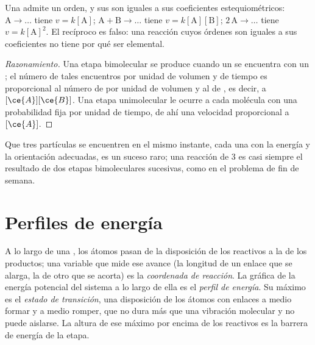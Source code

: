 \begin{proposition}\label{prop:b1:elementary-steps:elementary-law}
Una  admite un orden, y sus  son iguales
a sus coeficientes estequiométricos: $\mathrm{A} \to \dots$ tiene
$v = k[\mathrm{A}]$;
$\mathrm{A} + \mathrm{B} \to \dots$ tiene $v = k[\mathrm{A}][\mathrm{B}]$;
$2\,\mathrm{A} \to \dots$ tiene $v = k[\mathrm{A}]^2$. El recíproco es
falso: una reacción cuyos órdenes son iguales a sus coeficientes no tiene
por qué ser elemental.
\end{proposition}

\begin{proof}[Razonamiento]
Una etapa bimolecular se produce cuando un  se encuentra con un
; el número de tales encuentros por unidad de volumen y de tiempo es
proporcional al número de  por unidad de volumen y al de , es
decir, a
$[\ce{A}][\ce{B}]$. Una etapa unimolecular le ocurre a cada molécula con
una probabilidad fija por unidad de tiempo, de ahí una velocidad
proporcional a $[\ce{A}]$.
\end{proof}

\begin{remark}\label{rem:b1:elementary-steps:termolecular}
Que tres partículas se encuentren en el mismo instante, cada una con la
energía y la orientación adecuadas, es un suceso raro; una reacción de
 3 es casi siempre el resultado de dos etapas bimoleculares
sucesivas, como en el problema de fin de semana.
\end{remark}

\section{Perfiles de energía}

\begin{definition}\label{def:b1:elementary-steps:energy-profile}
A lo largo de una , los átomos pasan de la disposición de
los reactivos a la de los productos; una variable que mide ese avance (la
longitud de un enlace que se alarga, la de otro que se acorta) es la
\emph{coordenada de reacción}. La gráfica de la
energía potencial del sistema a lo largo de ella es el \emph{perfil de
energía}. Su máximo es el \emph{estado de
transición}, una disposición de los átomos con
enlaces a medio formar y a medio romper, que no dura más que una
vibración molecular y no puede aislarse. La altura de ese máximo por
encima de los reactivos es la barrera de energía de la etapa.
\end{definition}

